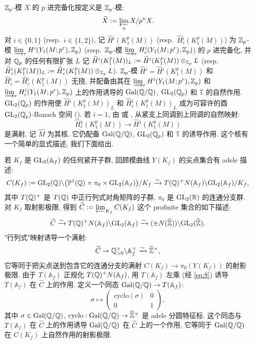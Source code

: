 $\mathbb{Z}_p$-模 $X$ 的 $p$ 进完备化按定义是 $\mathbb{Z}_p$-模:
\[
\widehat{X} := \varprojlim_n X/p^{n}X.
\]
对 $i \in \{0,1\}$ (resp.\ $i \in \{1,2\}$), 记 $\widehat{H}{}^{i}(K_1^{p}(M))$ (resp.\ $\widehat{H}{}_{c}^{i}(K_1^{p}(M))$) 为 $\mathbb{Z}_p$-模 $\varinjlim_r H^{i}(Y_1(M;p^{r}),\mathbb{Z}_p)$ (resp.\ $\mathbb{Z}_p$-模 $\varinjlim_r H_{c}^{i}(Y_1(M;p^{r}),\mathbb{Z}_p)$) 的 $p$ 进完备化, 并对 $\mathbb{Q}_p$ 的任何有限扩张 $L$ 记 $\widehat{H}{}^{i}(K_1^{p}(M))_L := \widehat{H}{}^{i}(K_1^{p}(M)) \otimes_{\mathbb{Z}_p} L$ (resp.\ $\widehat{H}{}_{c}^{i}(K_1^{p}(M))_L := \widehat{H}{}_{c}^{i}(K_1^{p}(M)) \otimes_{\mathbb{Z}_p} L$).
$\mathbb{Z}_p$-模 $\widehat{H}{}^{i} = \widehat{H}{}^{i}(K_1^{p}(M))$ 和 $\widehat{H}{}_{c}^{i} = \widehat{H}{}_{c}^{i}(K_1^{p}(M))$ 无挠, 并配备由其在 $\varinjlim_r H^{i}(Y_1(M;p^{r}),\mathbb{Z}_p)$ 和 $\varinjlim_r H_{c}^{i}(Y_1(M;p^{r}),\mathbb{Z}_p)$ 上的作用诱导的 $\operatorname{Gal}(\mathbb{Q}/\mathbb{Q})$, $\mathrm{GL}_2(\mathbb{Q}_p)$ 和 $\mathbb{T}$ 的自然作用.
$\mathrm{GL}_2(\mathbb{Q}_p)$ 的作用使 $\widehat{H}{}^{i}(K_1^{p}(M))_L$ 和 $\widehat{H}{}_{c}^{i}(K_1^{p}(M))_L$ 成为可容许的酉 $\mathrm{GL}_2(\mathbb{Q}_p)$-Banach 空间 (\cite[Th.~2.2.13]{ref:24}).
若 $i = 1$, 由 \cite[Lem.~2.2.1]{ref:9} 或 \cite[Prop.~4.3.9]{ref:24}, 从紧支上同调到上同调的自然映射:
\begin{equation}
\label{eq:7}
\widehat{H}{}_{c}^{1}(K_1^{p}(M)) \to \widehat{H}{}^{1}(K_1^{p}(M))
\end{equation}
是满射, 记 $\widehat{M}$ 为其核.
它仍配备 $\operatorname{Gal}(\mathbb{Q}/\mathbb{Q})$, $\mathrm{GL}_2(\mathbb{Q}_p)$ 和 $\mathbb{T}$ 的诱导作用.
这个核有一个简单的显式描述, 我们下面给出.

若 $K_f$ 是 $\mathrm{GL}_2(\mathbb{A}_f)$ 的任何紧开子群, 回顾模曲线 $Y(K_f)$ 的尖点集合有 adele 描述:
\[
C(K_f) := \mathrm{GL}_2(\mathbb{Q})\backslash\bigl(\mathbb{P}^{1}(\mathbb{Q}) \times \pi_0 \times \mathrm{GL}_2(\mathbb{A}_f)\bigr)/K_f \xrightarrow{\sim} T(\mathbb{Q})^{+}N(\mathbb{A}_f)\backslash \mathrm{GL}_2(\mathbb{A}_f)/K_f,
\]
其中 $T(\mathbb{Q})^{+}$ 是 $T(\mathbb{Q})$ 中正行列式对角矩阵的子群, $\pi_0$ 是 $\mathrm{GL}_2(\mathbb{R})$ 的连通分支群.
对 $K_f$ 取射影极限, 得到 $\widehat{C} := \varprojlim_{K_f} C(K_f)$ 这个 profinite 集合的如下描述:
\begin{equation}
\label{eq:8}
\widehat{C} \xrightarrow{\sim} T(\mathbb{Q})^{+}N(\mathbb{A}_f)\backslash \mathrm{GL}_2(\mathbb{A}_f) \xrightarrow{\sim} (\pm N(\widehat{\mathbb{Z}}))\backslash \mathrm{GL}_2(\widehat{\mathbb{Z}}).
\end{equation}
"行列式"映射诱导一个满射:
\begin{equation}
\label{eq:9}
\widehat{C} \twoheadrightarrow \mathbb{Q}_{>0}^{\times}\backslash \mathbb{A}_f^{\times} \xrightarrow{\sim} \widehat{\mathbb{Z}}^{\times},
\end{equation}
它等同于把尖点送到包含它的连通分支的满射 $C(K_f) \to \pi_0(Y(K_f))$ 的射影极限.
由于 $T(\mathbb{A}_f)$ 正规化 $T(\mathbb{Q})^{+}N(\mathbb{A}_f)$, 用 $T(\mathbb{A}_f)$ 左乘 (经 \eqref{eq:8}) 诱导 $T(\mathbb{A}_f)$ 在 $\widehat{C}$ 上的作用.
定义一个同态 $\operatorname{Gal}(\mathbb{Q}/\mathbb{Q}) \to T(\mathbb{A}_f)$:
\[
\sigma \mapsto \begin{pmatrix} \mathrm{cyclo}(\sigma) & 0 \\ 0 & 1 \end{pmatrix},
\]
其中 $\sigma \in \operatorname{Gal}(\mathbb{Q}/\mathbb{Q})$, $\mathrm{cyclo} : \operatorname{Gal}(\mathbb{Q}/\mathbb{Q}) \to \widehat{\mathbb{Z}}^{\times}$ 是 adele 分圆特征标.
这个同态与 $T(\mathbb{A}_f)$ 在 $\widehat{C}$ 上的作用诱导 $\operatorname{Gal}(\mathbb{Q}/\mathbb{Q})$ 在 $\widehat{C}$ 上的一个作用, 它等同于 $\operatorname{Gal}(\mathbb{Q}/\mathbb{Q})$ 在 $C(K_f)$ 上自然作用的射影极限.


